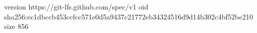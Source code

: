 version https://git-lfs.github.com/spec/v1
oid sha256:ec1dbccb453ccfcc571e0d5a9437c21772eb34324516d9d14b302c4bf52be210
size 856
